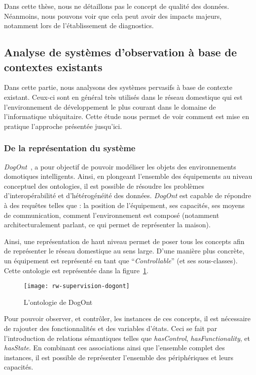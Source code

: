Dans cette thèse, nous ne détaillons pas le concept de qualité des données. Néanmoins, nous pouvons voir que cela peut avoir des impacts majeurs, notamment lors de l'établissement de diagnostics.

\subsection{Analyse de systèmes d'observation à base de contextes existants}
Dans cette partie, nous analysons des systèmes pervasifs à base de contexte existant. Ceux-ci sont en général très utilisés dans le réseau domestique qui est l'environnement de développement le plus courant dans le domaine de l'informatique ubiquitaire. Cette étude nous permet de voir comment est mise en pratique l'approche présentée jusqu'ici.

\subsubsection{De la représentation du système}
\textit{DogOnt}~\cite{Bonino:dogont}, a pour objectif de pouvoir modéliser les objets des environnements domotiques intelligents. Ainsi, en plongeant l'ensemble des équipements au niveau conceptuel des ontologies, il est possible de résoudre les problèmes d'interopérabilité et d'hétérogénéité des données. \textit{DogOnt} est capable de répondre à des requêtes telles que : la position de l'équipement, ses capacités, ses moyens de communication, comment l'environnement est composé (notamment architecturalement parlant, ce qui permet de représenter la maison).

Ainsi, une représentation de haut niveau permet de poser tous les concepts afin de représenter le réseau domestique au sens large. D'une manière plus concrète, un équipement est représenté en tant que \enquote{\it Controllable} (et ses sous-classes). Cette ontologie est représentée dans la figure~\ref{fig:rw:supervision:dogont}.

\begin{figure}[ht]
    \centering
    \texttt{[image: rw-supervision-dogont]}
    \caption{L'ontologie de DogOnt}\label{fig:rw:supervision:dogont}
\end{figure}
Pour pouvoir observer, et contrôler, les instances de ces concepts, il est nécessaire de rajouter des fonctionnalités et des variables d'états. Ceci se fait par l'introduction de relations sémantiques telles que \textit{hasControl}, \textit{hasFunctionality}, et \textit{hasState}. En combinant ces associations ainsi que l'ensemble complet des instances, il est possible de représenter l'ensemble des périphériques et leurs capacités.

